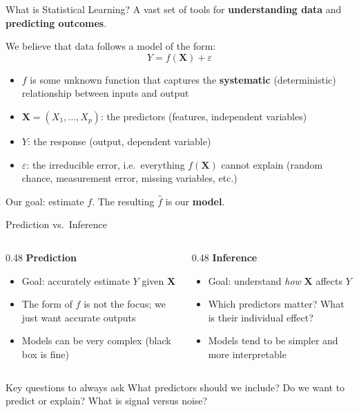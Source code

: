 \documentclass[aspectratio=169]{beamer}
\begin{document}
\begin{frame}{What is Statistical Learning?}
	A vast set of tools for \textbf{understanding data} and \textbf{predicting outcomes}.

	\bigskip
	We believe that data follows a model of the form:
	\[
		Y = f(\mathbf{X}) + \varepsilon
	\]
	\begin{itemize}
		\item $f$ is some unknown function that captures the \textbf{systematic} (deterministic) relationship between inputs and output
		\item $\mathbf{X} = (X_1, \dots, X_p)$: the predictors (features, independent variables)
		\item $Y$: the response (output, dependent variable)
		\item $\varepsilon$: the irreducible error, i.e.\ everything $f(\mathbf{X})$ cannot explain (random chance, measurement error, missing variables, etc.)
	\end{itemize}

	\medskip
	Our goal: estimate $f$. The resulting $\hat{f}$ is our \textbf{model}.
\end{frame}

\begin{frame}{Prediction vs.\ Inference}
	\begin{columns}[T]
		\begin{column}{0.48\textwidth}
			\textbf{Prediction}
			\begin{itemize}
				\item Goal: accurately estimate $Y$ given $\mathbf{X}$
				\item The form of $f$ is not the focus; we just want accurate outputs
				\item Models can be very complex (black box is fine)
			\end{itemize}
		\end{column}
		\begin{column}{0.48\textwidth}
			\textbf{Inference}
			\begin{itemize}
				\item Goal: understand \emph{how} $\mathbf{X}$ affects $Y$
				\item Which predictors matter? What is their individual effect?
				\item Models tend to be simpler and more interpretable
			\end{itemize}
		\end{column}
	\end{columns}

	\bigskip
	\begin{exampleblock}{Key questions to always ask}
		What predictors should we include? Do we want to predict or explain? What is signal versus noise?
	\end{exampleblock}
\end{frame}
\end{document}
